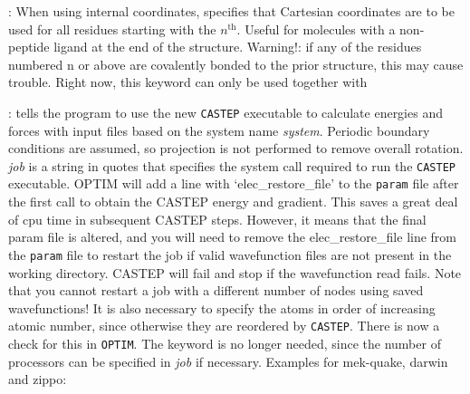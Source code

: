 {{: When using internal coordinates, specifies that
  Cartesian coordinates are to be used for all
  residues starting with the $n^{\mbox{th}}$. Useful for molecules with a
  non-peptide ligand at the end of the structure. Warning!: if any of the
  residues numbered n or above are covalently bonded to the prior structure,
  this may cause trouble. Right now, this keyword can only be used together
  with {}

: tells the program to use the new {\tt CASTEP} 
executable to calculate energies and
forces with input files based on the system name {\it system\/}. Periodic boundary 
conditions are assumed, so projection is not performed to remove overall rotation.
{\it job} is a string in quotes that specifies the system call required to run 
the {\tt CASTEP} executable. 
OPTIM will add a line with `elec\_restore\_file' to the {\tt param} file after the
first call to obtain the CASTEP energy and gradient.
This saves a great deal of cpu time in subsequent CASTEP steps.
However, it means that the final param file is altered, and you will need
to remove the elec\_restore\_file line from the {\tt param} file to restart
the job if valid wavefunction files are not present in the working directory.
CASTEP will fail and stop if the wavefunction read fails.
Note that you cannot restart a job with a different number of nodes using
saved wavefunctions!
It is also necessary to specify the atoms in order of increasing atomic number,
since otherwise they are reordered by {\tt CASTEP}.
There is now a check for this in {\tt OPTIM}.
The {} keyword is no longer needed, since
the number of processors can be specified in {\it job} if necessary. Examples for mek-quake, darwin and zippo:

}}

